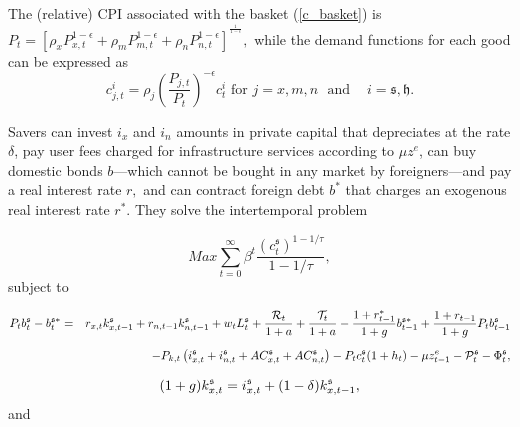 \documentclass[11pt]{article}
\begin{document}
The (relative) CPI associated with the basket (\ref{c_basket}) is $P_{t}=%
\left[ \rho _{x}P_{x,t}^{1-\epsilon }+\rho _{m}P_{m,t}^{1-\epsilon }+\rho
_{n}P_{n,t}^{1-\epsilon }\right] ^{^{\frac{1}{1-\epsilon }}},$ while the
demand functions for each good can be expressed as 
\begin{equation*}
c_{j,t}^{i}=\rho _{j}\left( \frac{P_{j,t}}{P_{t}}\right) ^{-\epsilon
}c_{t}^{i}\text{ \ \ \ \ \ \ for \ \ \ }j=x,m,n\ \ \ \text{and \ \ }\ \text{ 
}i=\mathfrak{s},\mathfrak{h}.
\end{equation*}

Savers can invest $i_{x}$ and $i_{n}$ amounts in private capital that
depreciates at the rate $\delta $, pay user fees charged for infrastructure
services according to $\mu z^{e}$, can buy domestic bonds $b$---which cannot
be bought in any market by foreigners---and pay a real interest rate $r,$
and can contract foreign debt $b^{\ast }$ that charges an exogenous real
interest rate $r^{\ast }$. They solve the intertemporal problem

\begin{equation*}
Max\sum_{t=0}^{\infty }\beta ^{t}\frac{\left( c_{t}^{\mathfrak{s}}\right)
^{1-1/\tau }}{1-1/\tau },
\end{equation*}%
subject to

\begin{eqnarray}
P_{t}b_{t}^{\mathfrak{s}}-b_{t}^{\mathfrak{s}\ast } &=&r_{x,t}k_{x,t-1}^{%
\mathfrak{s}}+r_{n,t-1}k_{n,t-1}^{\mathfrak{s}}+w_{t}L_{t}^{\mathfrak{s}}+%
\frac{\mathcal{R}_{t}}{1+a}+\frac{\mathcal{T}_{t}}{1+a}-\frac{%
1+r_{t-1}^{\ast }}{1+g}b_{t-1}^{\mathfrak{s}\ast }+\frac{1+r_{t-1}}{1+g}%
P_{t}b_{t-1}^{\mathfrak{s}}  \notag \\[0.08in]
&&-P_{k,t}\left( i_{x,t}^{\mathfrak{s}}+i_{n,t}^{\mathfrak{s}}+AC_{x,t}^{%
\mathfrak{s}}+AC_{n,t}^{\mathfrak{s}}\right) -P_{t}c_{t}^{\mathfrak{s}%
}(1+h_{t})-\mu z_{t-1}^{e}-\mathcal{P}_{t}^{\mathfrak{s}}-\Phi _{t}^{%
\mathfrak{s}},  \label{BCs}
\end{eqnarray}

\begin{equation}
(1+g)k_{x,t}^{\mathfrak{s}}=i_{x,t}^{\mathfrak{s}}+(1-\delta )k_{x,t-1}^{%
\mathfrak{s}},  \label{kx_accum}
\end{equation}%
and
\end{document}
